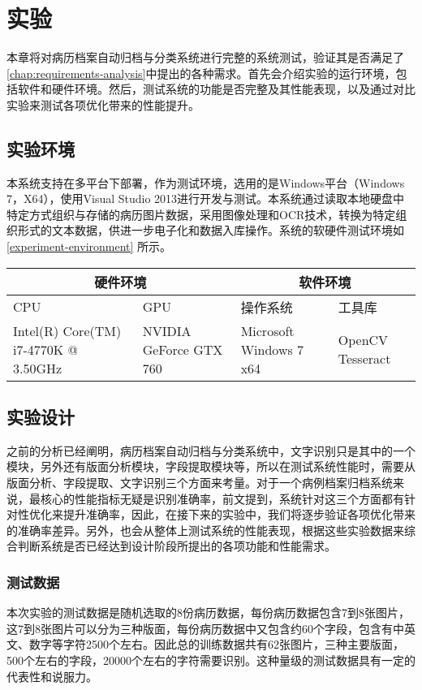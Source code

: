 \chapter{实验}
\label{chap:experiments}
本章将对病历档案自动归档与分类系统进行完整的系统测试，验证其是否满足了\autoref{chap:requirements-analysis}中提出的各种需求。首先会介绍实验的运行环境，包括软件和硬件环境。然后，测试系统的功能是否完整及其性能表现，以及通过对比实验来测试各项优化带来的性能提升。
\section{实验环境}
本系统支持在多平台下部署，作为测试环境，选用的是Windows平台（Windows 7，X64），使用Visual Studio 2013进行开发与测试。本系统通过读取本地硬盘中特定方式组织与存储的病历图片数据，采用图像处理和OCR技术，转换为特定组织形式的文本数据，供进一步电子化和数据入库操作。系统的软硬件测试环境如\autoref{experiment-environment} 所示。
\begin{table}[!htbp]
	\label{experiment-environment}
	\centering
	\vspace{10pt}
  \renewcommand\arraystretch{1.5}  %
	\begin{tabular}{p{3cm}|p{3cm}|p{3cm}|p{3cm}}
    \hline
    \multicolumn{2}{c|}{硬件环境} & \multicolumn{2}{c}{软件环境} \\
		\hline
    CPU&GPU&操作系统&工具库 \\
		\hline
    Intel(R) Core(TM)  i7-4770K @ 3.50GHz & NVIDIA GeForce  GTX 760 & Microsoft  Windows 7 x64 & OpenCV  Tesseract \\
    \hline
	\end{tabular}
\end{table}

\section{实验设计}
\label{sec:experiment-design}
之前的分析已经阐明，病历档案自动归档与分类系统中，文字识别只是其中的一个模块，另外还有版面分析模块，字段提取模块等，所以在测试系统性能时，需要从版面分析、字段提取、文字识别三个方面来考量。对于一个病例档案归档系统来说，最核心的性能指标无疑是识别准确率，前文提到，系统针对这三个方面都有针对性优化来提升准确率，因此，在接下来的实验中，我们将逐步验证各项优化带来的准确率差异。另外，也会从整体上测试系统的性能表现，根据这些实验数据来综合判断系统是否已经达到设计阶段所提出的各项功能和性能需求。
\subsection*{测试数据}
本次实验的测试数据是随机选取的8份病历数据，每份病历数据包含7到8张图片，这7到8张图片可以分为三种版面，每份病历数据中又包含约60个字段，包含有中英文、数字等字符2500个左右。因此总的训练数据共有62张图片，三种主要版面，500个左右的字段，20000个左右的字符需要识别。这种量级的测试数据具有一定的代表性和说服力。
